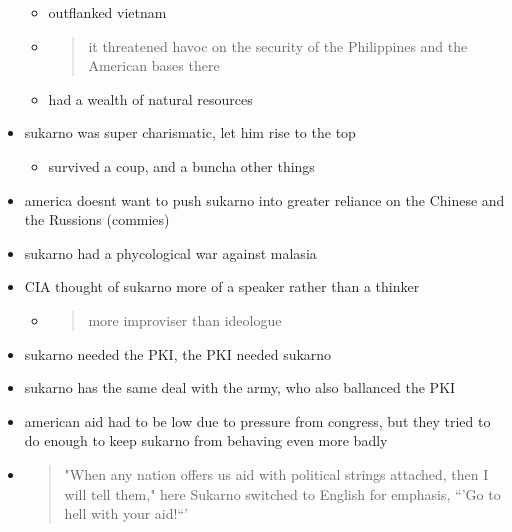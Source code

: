 \documentclass[letterpaper]{article}
\begin{document}
\begin{itemize}
\begin{itemize}
\item outflanked vietnam

\item \begin{quote}
it threatened havoc on the security of the Philippines and the
American bases there
\end{quote}

\item had a wealth of natural resources
\end{itemize}

\item sukarno was super charismatic, let him rise to the top

\begin{itemize}
\item survived a coup, and a buncha other things
\end{itemize}

\item america doesnt want to push sukarno into greater reliance on the
Chinese and the Russions (commies)

\item sukarno had a phycological war against malasia

\item CIA thought of sukarno more of a speaker rather than a thinker

\begin{itemize}
\item \begin{quote}
more improviser than ideologue
\end{quote}
\end{itemize}

\item sukarno needed the PKI, the PKI needed sukarno

\item sukarno has the same deal with the army, who also ballanced the PKI

\item american aid had to be low due to pressure from congress, but they
tried to do enough to keep sukarno from behaving even more badly

\item \begin{quote}
"When any nation offers us aid with political strings attached, then
I will tell them," here Sukarno switched to English for emphasis,
“'Go to hell with your aid!“'
\end{quote}


\end{itemize}
\end{document}
